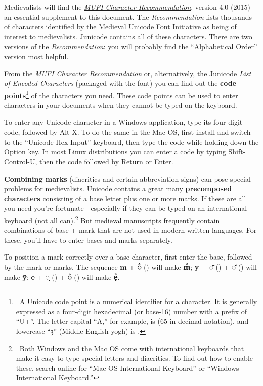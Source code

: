 Medievalists will find the \href{https://bora.uib.no/bora-xmlui/handle/1956/10699}%
{\textit{MUFI Character Recommendation}}, version 4.0 (2015)
an essential supplement to this document. The \textit{Recommendation} lists
thousands of characters identified by the
Medieval Unicode Font Initiative as being of interest to medievalists. Junicode
contains all of these characters. There are two versions of the \textit{Recommendation}:
you will probably find the “Alphabetical Order” version most helpful.

From the \textit{MUFI Character Recommendation} or, alternatively, the Junicode
\textit{List of Encoded Characters} (packaged with the font) you can find out
the \textbf{code points}\footnote{\ A Unicode code point is a numerical identifier for a character.
It is generally expressed as a
four-digit hexadecimal (or base-16) number with a prefix of ``U+''. The letter
capital ``A,'' for example, is  (65
in decimal notation), and lowercase ``ȝ'' (Middle English yogh) is .}
of the characters you need. These code points can be used to enter
characters in your documents when they cannot be typed on the keyboard.

To enter any Unicode character in a Windows application, type its four-digit
code, followed by Alt-X. To do the same in the Mac OS, first install and switch
to the “Unicode Hex Input” keyboard, then type the code while holding down the Option
key. In most Linux distributions you can enter a code by typing Shift-Control-U,
then the code followed by Return or Enter.

\textbf{Combining marks} (diacritics and certain abbreviation signs) can pose special problems for
medievalists. Unicode contains a great
many \textbf{precomposed characters} consisting of a base letter plus one or more marks.
If these are all you need you're fortunate---especially if they can be
typed on an international keyboard (not all can).\footnote{\ Both
Windows and the Mac OS come with international keyboards that make it easy to
type special letters and diacritics. To find out how to enable these, search
online for “Mac OS International Keyboard” or “Windows International Keyboard.”}
But medieval manuscripts frequently contain
combinations of base + mark that are not used in modern written languages.
For these, you'll have to
enter bases and marks separately.

To position a mark correctly over a base character, first enter the base,
followed by the mark or marks.
The sequence \textbf{m} + \textbf{◌ᷙ} ()
will make \textbf{mᷙ}; \textbf{y} + \textbf{◌̄} () + \textbf{◌̆} () will make \textbf{ȳ̆};
\textbf{e} + \textbf{◌̣} () + \textbf{◌ᷠ} () will make \textbf{ẹᷠ}.

